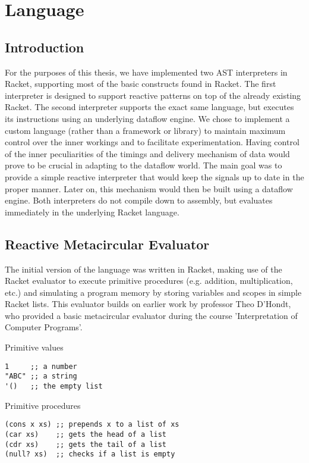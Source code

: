 \chapter{Language}
\lstset{language=lisp,showtabs=false}

\section{Introduction}

For the purposes of this thesis, we have implemented two AST interpreters in Racket, supporting most of the basic constructs found in Racket. The first interpreter is designed to support reactive patterns on top of the already existing Racket. The second interpreter supports the exact same language, but executes its instructions using an underlying dataflow engine. We chose to implement a custom language (rather than a framework or library) to maintain maximum control over the inner workings and to facilitate experimentation. Having control of the inner peculiarities of the timings and delivery mechanism of data would prove to be crucial in adapting to the dataflow world. The main goal was to provide a simple reactive interpreter that would keep the signals up to date in the proper manner. Later on, this mechanism would then be built using a dataflow engine. Both interpreters do not compile down to assembly, but evaluates immediately in the underlying Racket language. 

\section{Reactive Metacircular Evaluator}

The initial version of the language was written in Racket, making use of the Racket evaluator to execute primitive procedures (e.g. addition, multiplication, etc.) and simulating a program memory by storing variables and scopes in simple Racket lists. This evaluator builds on earlier work by professor Theo D'Hondt, who provided a basic metacircular evaluator during the course 'Interpretation of Computer Programs'. 

Primitive values
\begin{lstlisting}
1     ;; a number
"ABC" ;; a string
'()   ;; the empty list
\end{lstlisting}

Primitive procedures
\begin{lstlisting}
(cons x xs) ;; prepends x to a list of xs
(car xs)    ;; gets the head of a list
(cdr xs)    ;; gets the tail of a list
(null? xs)  ;; checks if a list is empty
\end{lstlisting}

